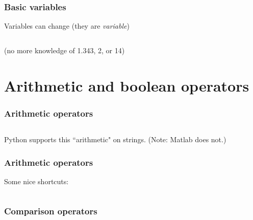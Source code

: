 \documentclass{beamer}
\begin{document}
\begin{frame}
\frametitle{Basic variables}

Variables can change (they are \emph{variable})

\begin{center}
\begin{tabular}{c}

\end{tabular}
\end{center}

(no more knowledge of 1.343, 2, or 14)

\end{frame}


\section{Arithmetic and boolean operators}

\begin{frame}
\frametitle{Arithmetic operators}

\begin{center}
\begin{tabular}{c}

\end{tabular}
\end{center}

Python supports this ``arithmetic" on strings.  (Note: Matlab does not.)
\end{frame}

\begin{frame}
\frametitle{Arithmetic operators}

Some nice shortcuts:

\begin{center}
\begin{tabular}{c}

\end{tabular}
\end{center}

\end{frame}


\begin{frame}
\frametitle{Comparison operators}

\begin{center}
\begin{tabular}{c}

\end{tabular}
\end{center}

\end{frame}
\end{document}
